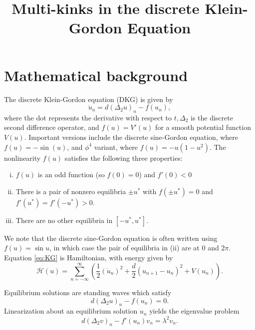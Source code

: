 \documentclass[12pt,reqno]{amsart}
\begin{document}
\title{Multi-kinks in the discrete Klein-Gordon Equation}

\maketitle

\section{Mathematical background}

The discrete Klein-Gordon equation (DKG) is given by
\begin{equation}\label{eq:KG}
\ddot{u}_n = d (\Delta_2 u)_n - f(u_n),
\end{equation}
where the dot represents the derivative with respect to $t, \Delta_2$ is the discrete second difference operator, and $f(u) = V'(u)$ for a smooth potential function $V(u)$. Important versions include the discrete sine-Gordon equation, where $f(u) = -\sin(u)$, and $\phi^4$ variant, where $f(u) = -u(1-u^2)$. The nonlinearity $f(u)$ satisfies the following three properties:
\begin{enumerate}[(i)]
	\item $f(u)$ is an odd function (so $f(0) = 0$) and $f'(0) < 0$
	\item There is a pair of nonzero equilibria $\pm u^*$ with $f(\pm u^*) = 0$ and $f'(u^*) = f'(-u^*) > 0$.
	\item There are no other equilibria in $[-u^*, u^*]$.
\end{enumerate}
We note that the discrete sine-Gordon equation is often written using $f(u) = \sin u$, in which case the pair of equilibria in (ii) are at 0 and $2 \pi$. Equation \cref{eq:KG} is Hamiltonian, with energy given by \cite{KevrekidisWeinstein2000}
\begin{equation}
	\mathcal{H}(u) = \sum_{n=-\infty}^\infty 
	\left( \frac{1}{2} (\dot{u}_n)^2 + \frac{d}{2} (u_{n+1} - u_n)^2 + V(u_n) \right).
\end{equation}

Equilibrium solutions are standing waves which satisfy 
\begin{equation}\label{eq:KGeq}
d (\Delta_2 u)_n - f(u_n) = 0.
\end{equation}
Linearization about an equilibrium solution $u_n$ yields the eigenvalue problem
\begin{equation}\label{eq:KGevp1}
d (\Delta_2 v)_n - f'(u_n)v_n = \lambda^2 v_n.
\end{equation}
\end{document}
